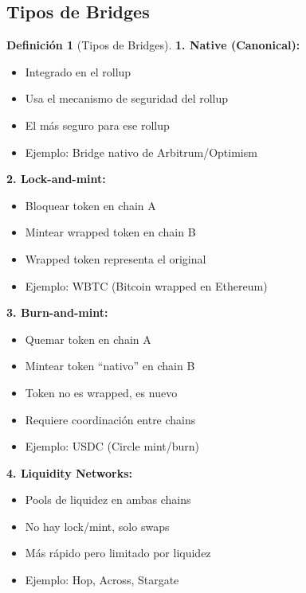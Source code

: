 \documentclass[11pt,a4paper,twoside,openright]{book}
\theoremstyle{definition}
\newtheorem{definition}{Definición}[chapter]
\theoremstyle{plain}
\theoremstyle{remark}
\begin{document}
\subsection{Tipos de Bridges}

\begin{definition}[Tipos de Bridges]
\textbf{1. Native (Canonical):}
\begin{itemize}
    \item Integrado en el rollup
    \item Usa el mecanismo de seguridad del rollup
    \item El más seguro para ese rollup
    \item Ejemplo: Bridge nativo de Arbitrum/Optimism
\end{itemize}

\textbf{2. Lock-and-mint:}
\begin{itemize}
    \item Bloquear token en chain A
    \item Mintear wrapped token en chain B
    \item Wrapped token representa el original
    \item Ejemplo: WBTC (Bitcoin wrapped en Ethereum)
\end{itemize}

\textbf{3. Burn-and-mint:}
\begin{itemize}
    \item Quemar token en chain A
    \item Mintear token ``nativo'' en chain B
    \item Token no es wrapped, es nuevo
    \item Requiere coordinación entre chains
    \item Ejemplo: USDC (Circle mint/burn)
\end{itemize}

\textbf{4. Liquidity Networks:}
\begin{itemize}
    \item Pools de liquidez en ambas chains
    \item No hay lock/mint, solo swaps
    \item Más rápido pero limitado por liquidez
    \item Ejemplo: Hop, Across, Stargate
\end{itemize}
\end{definition}
\end{document}
